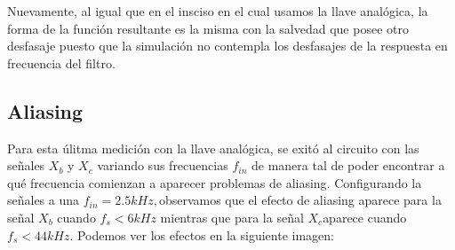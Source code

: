 \documentclass[../../ASSD_TP1_G7.tex]{subfiles}
\begin{document}
Nuevamente, al igual que en el insciso en el cual usamos la llave
analógica, la forma de la función resultante es la misma con la salvedad
que posee otro desfasaje puesto que la simulación no contempla los desfasajes de la respuesta en frecuencia del filtro.

\subsection{Aliasing}

Para esta úlitma medición con la llave analógica, se exitó al circuito
con las señales $X_{b}$ y $X_{c}$ variando sus frecuencias $f_{in}$
de manera tal de poder encontrar a qué frecuencia comienzan a aparecer
problemas de aliasing. Configurando la señales a una $f_{in}=2.5kHz,$observamos
que el efecto de aliasing aparece para la señal $X_{b}$ cuando $f_{s}<6kHz$
mientras que para la señal $X_{c}$aparece cuando $f_{s}<44kHz$.
Podemos ver los efectos en la siguiente imagen:
\end{document}
